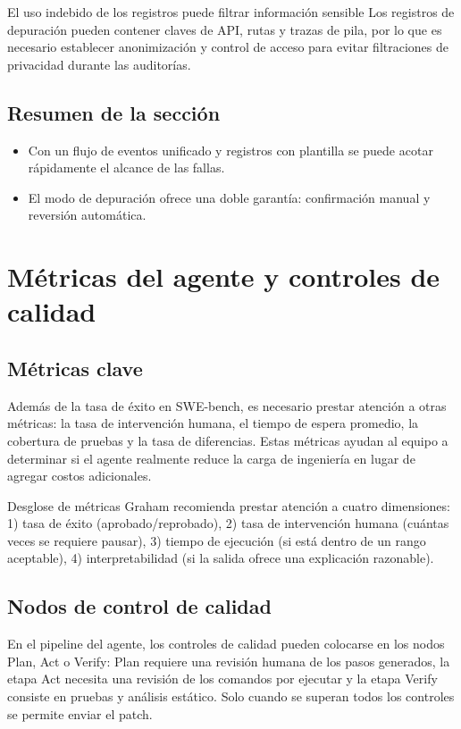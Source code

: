 \documentclass[a4paper]{article}
\begin{document}
\begin{warningbox}{El uso indebido de los registros puede filtrar información sensible}
Los registros de depuración pueden contener claves de API, rutas y trazas de pila, por lo que es necesario establecer anonimización y control de acceso para evitar filtraciones de privacidad durante las auditorías.
\end{warningbox}

\subsection{Resumen de la sección}
\begin{itemize}
    \item Con un flujo de eventos unificado y registros con plantilla se puede acotar rápidamente el alcance de las fallas.
    \item El modo de depuración ofrece una doble garantía: confirmación manual y reversión automática.
\end{itemize}
\section{Métricas del agente y controles de calidad}
\subsection{Métricas clave}
Además de la tasa de éxito en SWE-bench, es necesario prestar atención a otras métricas: la tasa de intervención humana, el tiempo de espera promedio, la cobertura de pruebas y la tasa de diferencias. Estas métricas ayudan al equipo a determinar si el agente realmente reduce la carga de ingeniería en lugar de agregar costos adicionales.

\begin{importantbox}{Desglose de métricas}
Graham recomienda prestar atención a cuatro dimensiones: 1) tasa de éxito (aprobado/reprobado), 2) tasa de intervención humana (cuántas veces se requiere pausar), 3) tiempo de ejecución (si está dentro de un rango aceptable), 4) interpretabilidad (si la salida ofrece una explicación razonable).
\end{importantbox}

\subsection{Nodos de control de calidad}
En el pipeline del agente, los controles de calidad pueden colocarse en los nodos Plan, Act o Verify: Plan requiere una revisión humana de los pasos generados, la etapa Act necesita una revisión de los comandos por ejecutar y la etapa Verify consiste en pruebas y análisis estático. Solo cuando se superan todos los controles se permite enviar el patch.
\end{document}
